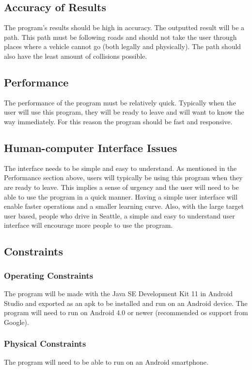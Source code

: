 \documentclass[12pt]{article}
\begin{document}
\subsection{Accuracy of Results}
The program's results should be high in accuracy. The outputted result will be a path. This path must be following roads and should not take the user through places where a vehicle cannot go (both legally and physically). The path should also have the least amount of collisions possible.

\subsection{Performance}
The performance of the program must be relatively quick. Typically when the user will use this program, they will be ready to leave and will want to know the way immediately. For this reason the program should be fast and responsive.

\subsection{Human-computer Interface Issues}
The interface needs to be simple and easy to understand. As mentioned in the Performance section above, users will typically be using this program when they are ready to leave. This implies a sense of urgency and the user will need to be able to use the program in a quick manner. Having a simple user interface will enable faster operations and a smaller learning curve. Also, with the large target user based, people who drive in Seattle, a simple and easy to understand user interface will encourage more people to use the program.

\subsection{Constraints}
    \subsubsection{Operating Constraints}
    The program will be made with the Java SE Development Kit 11 in Android Studio and exported as an apk to be installed and run on an Android device. The program will need to run on Android 4.0 or newer (recommended os support from Google).
    
    \subsubsection{Physical Constraints}
    The program will need to be able to run on an Android smartphone.
\end{document}

